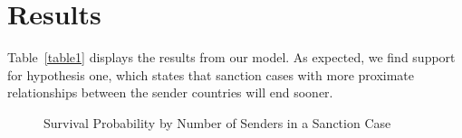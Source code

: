 \section*{Results}
\label{Results} 

Table~\ref{table1} displays the results from our model. As expected, we find support for hypothesis one, which states that sanction cases with more proximate relationships between the sender countries will end sooner. 



\begin{figure}[ht]
	\centering
	\caption{Survival Probability by Number of Senders in a Sanction Case}
	\resizebox{1\textwidth}{!}{}
\end{figure}

\begin{figure}[ht]
	\centering
	\resizebox{1\textwidth}{!}{}	
\end{figure}

\begin{figure}[ht]
	\centering
	\resizebox{1\textwidth}{!}{}	
\end{figure}

